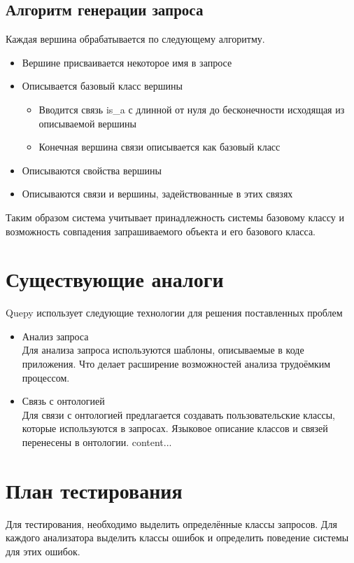 \subsection{Алгоритм генерации запроса}
Каждая вершина обрабатывается по следующему алгоритму.
\begin{itemize}
\item Вершине присваивается некоторое имя в запросе
\item Описывается базовый класс вершины
\begin{itemize}
\item Вводится связь is\_a с длинной от нуля до бесконечности исходящая из описываемой вершины 
\item Конечная вершина связи описывается как базовый класс
\end{itemize}
\item Описываются свойства вершины
\item Описываются связи и вершины, задействованные в этих связях
\end{itemize}
Таким образом система учитывает принадлежность системы базовому классу и возможность совпадения запрашиваемого объекта и его базового класса.

\section{Существующие аналоги}
Quepy использует следующие технологии для решения поставленных проблем
\begin{itemize}
\item Анализ запроса\\
Для анализа запроса используются шаблоны, описываемые в коде приложения. Что делает расширение возможностей анализа трудоёмким процессом. 
\item Связь с онтологией\\
Для связи с онтологией предлагается создавать пользовательские классы, которые используются в запросах. Языковое описание классов и связей перенесены в онтологии.
content...
\end{itemize}

\section{План тестирования}
Для тестирования, необходимо выделить определённые классы запросов. Для каждого анализатора выделить классы ошибок и определить поведение системы для этих ошибок.

